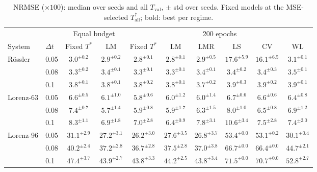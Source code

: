 \begin{table}[htbp]
  \centering
  \caption{NRMSE ($\times 100$): median over seeds and all $T_{\mathrm{val}}$, $\pm$ std over seeds. Fixed models at the MSE-selected $T^*_{\mathrm{all}}$; bold: best per regime.}
  \label{tab:nrmse}
  \footnotesize
  \setlength{\tabcolsep}{3pt}
  \begin{adjustbox}{max width=\textwidth}
  \begin{tabular}{ll cc cccccc}
    \toprule
    & & \multicolumn{2}{c}{Equal budget} & \multicolumn{6}{c}{200 epochs} \\
    \cmidrule(lr){3-4} \cmidrule(lr){5-10}
    System & $\Delta t$ & Fixed $T^*$ & LM & Fixed $T^*$ & LM & LMR & LS & CV & WL \\
    \midrule
    Rössler & 0.05 & $3.0^{\pm 0.2}$ & $\mathbf{2.9}^{\pm 0.2}$ & $\mathbf{2.8}^{\pm 0.1}$ & $\mathbf{2.8}^{\pm 0.1}$ & $2.9^{\pm 0.5}$ & $17.6^{\pm 5.9}$ & $16.1^{\pm 6.5}$ & $3.1^{\pm 0.1}$ \\
     & 0.08 & $\mathbf{3.3}^{\pm 0.2}$ & $3.4^{\pm 0.1}$ & $\mathbf{3.3}^{\pm 0.1}$ & $\mathbf{3.3}^{\pm 0.1}$ & $3.4^{\pm 0.1}$ & $3.4^{\pm 0.2}$ & $3.4^{\pm 0.3}$ & $3.5^{\pm 0.1}$ \\
     & 0.1 & $\mathbf{3.8}^{\pm 0.1}$ & $\mathbf{3.8}^{\pm 0.1}$ & $3.8^{\pm 0.2}$ & $3.8^{\pm 0.1}$ & $\mathbf{3.7}^{\pm 0.2}$ & $3.9^{\pm 0.3}$ & $3.9^{\pm 0.2}$ & $3.9^{\pm 0.1}$ \\
    \midrule
    Lorenz-63 & 0.05 & $6.6^{\pm 0.5}$ & $\mathbf{6.1}^{\pm 1.0}$ & $\mathbf{5.8}^{\pm 0.6}$ & $6.0^{\pm 1.2}$ & $6.0^{\pm 1.4}$ & $6.7^{\pm 0.6}$ & $6.6^{\pm 0.6}$ & $6.4^{\pm 0.8}$ \\
     & 0.08 & $7.4^{\pm 0.7}$ & $\mathbf{5.7}^{\pm 1.4}$ & $\mathbf{5.9}^{\pm 0.8}$ & $\mathbf{5.9}^{\pm 1.7}$ & $6.3^{\pm 1.5}$ & $8.0^{\pm 1.0}$ & $6.5^{\pm 0.8}$ & $6.9^{\pm 1.2}$ \\
     & 0.1 & $8.3^{\pm 1.1}$ & $\mathbf{6.9}^{\pm 1.8}$ & $7.0^{\pm 2.8}$ & $\mathbf{6.4}^{\pm 0.9}$ & $7.8^{\pm 3.1}$ & $10.6^{\pm 3.4}$ & $7.5^{\pm 2.8}$ & $7.4^{\pm 2.0}$ \\
    \midrule
    Lorenz-96 & 0.05 & $31.1^{\pm 2.9}$ & $\mathbf{27.2}^{\pm 3.1}$ & $\mathbf{26.2}^{\pm 3.0}$ & $27.6^{\pm 3.5}$ & $26.8^{\pm 3.7}$ & $53.4^{\pm 0.0}$ & $53.1^{\pm 0.2}$ & $30.1^{\pm 0.4}$ \\
     & 0.08 & $40.2^{\pm 2.4}$ & $\mathbf{37.2}^{\pm 2.8}$ & $\mathbf{36.7}^{\pm 2.8}$ & $37.5^{\pm 2.8}$ & $37.0^{\pm 3.8}$ & $66.7^{\pm 0.0}$ & $66.4^{\pm 0.0}$ & $44.7^{\pm 2.1}$ \\
     & 0.1 & $47.4^{\pm 3.7}$ & $\mathbf{43.9}^{\pm 2.7}$ & $\mathbf{43.8}^{\pm 3.3}$ & $44.2^{\pm 2.5}$ & $\mathbf{43.8}^{\pm 3.4}$ & $71.5^{\pm 0.0}$ & $70.7^{\pm 0.0}$ & $52.8^{\pm 2.7}$ \\
    \bottomrule
  \end{tabular}
  \end{adjustbox}
\end{table}
